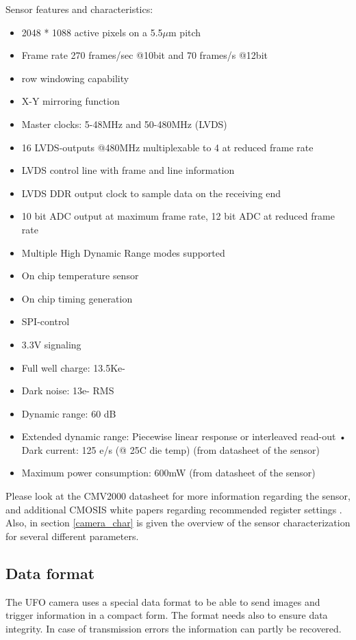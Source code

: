 Sensor features and characteristics:
\begin{itemize}
\item  2048 * 1088 active pixels on a 5.5$\mu$m pitch
\item Frame rate 270 frames/sec @10bit and 70 frames/s @12bit
\item row windowing capability
\item X-Y mirroring function
\item Master clocks: 5-48MHz and 50-480MHz (LVDS)
\item 16 LVDS-outputs @480MHz multiplexable to 4 at reduced frame rate
\item LVDS control line with frame and line information
\item LVDS DDR output clock to sample data on the receiving end
\item 10 bit ADC output at maximum frame rate, 12 bit ADC at reduced frame rate
\item Multiple High Dynamic Range modes supported
\item On chip temperature sensor
\item On chip timing generation
\item SPI-control
\item 3.3V signaling
\item Full well charge: 13.5Ke-
\item Dark noise: 13e- RMS
\item Dynamic range: 60 dB
\item Extended dynamic range: Piecewise linear response or interleaved read-out • Dark current: 125 e/s (@ 25C die temp) (from datasheet of the sensor)
\item Maximum power consumption: 600mW (from datasheet of the sensor)
\end{itemize}

Please look at the CMV2000 datasheet for more information regarding the sensor, and additional CMOSIS white papers regarding recommended register settings \cite{CMOSIS:CMV2000}. Also, in section \ref{camera_char} is given the overview of the sensor characterization for several different parameters.



\subsection{Data format}

The UFO camera uses a special data format to be able to send images and trigger 
information in a compact form. The format needs also to ensure data integrity. 
In case of transmission errors the information can partly be recovered. 

